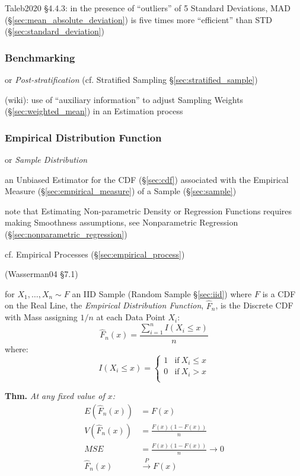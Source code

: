 Taleb2020 \S 4.4.3: in the presence of ``outliers'' of 5 Standard Deviations,
MAD (\S\ref{sec:mean_absolute_deviation}) is five times more ``efficient'' than
STD (\S\ref{sec:standard_deviation})



\subsubsection{Benchmarking}\label{sec:benchmarking}

or \emph{Post-stratification} (cf. Stratified Sampling
\S\ref{sec:stratified_sample})

(wiki): use of ``auxiliary information'' to adjust Sampling Weights
(\S\ref{sec:weighted_mean}) in an Estimation process



\subsubsection{Empirical Distribution Function}
\label{sec:empirical_distribution}

or \emph{Sample Distribution}

an Unbiased Estimator for the CDF (\S\ref{sec:cdf}) associated with the
Empirical Measure (\S\ref{sec:empirical_measure}) of a Sample
(\S\ref{sec:sample})

note that Estimating Non-parametric Density or Regression Functions requires
making Smoothness assumptions, see Nonparametric Regression
(\S\ref{sec:nonparametric_regression})

\fist cf. Empirical Processes (\S\ref{sec:empirical_process})

(Wasserman04 \S7.1)

for $X_1, \ldots, X_n \sim F$ an IID Sample (Random Sample \S\ref{sec:iid})
where $F$ is a CDF on the Real Line, the \emph{Empirical Distribution Function},
$\hat{F}_n$, is the Discrete CDF with Mass assigning $1/n$ at each Data Point
$X_i$:
\[
  \hat{F}_n(x) = \frac{\sum_{i=1}^n I(X_i \leq x)}{n}
\]
where:
\[
  I(X_i \leq x) = \begin{cases}
    1 & \text{if}\ X_i \leq x \\
    0 & \text{if}\ X_i > x \\
  \end{cases}
\]

\textbf{Thm.} \emph{
  At any fixed value of $x$:
  \begin{align*}
    E(\hat{F}_n(x)) & = F(x)                     \\
    V(\hat{F}_n(x)) & = \frac{F(x)(1 - F(x))}{n} \\
    MSE & = \frac{F(x)(1-F(x))}{n} \to 0 \\
    \hat{F}_n(x) & \xrightarrow{P} F(x)          \\
  \end{align*}
}

